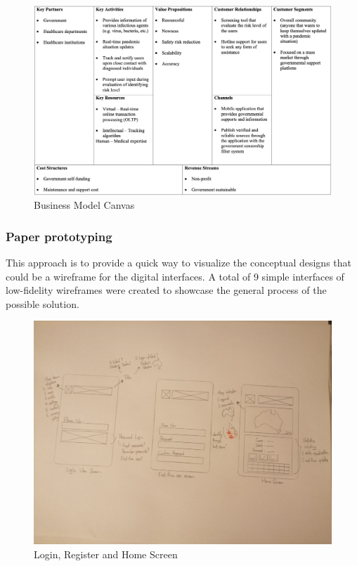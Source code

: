       \begin{figure}[H]
        \centering
        \includegraphics[width=18cm]{img/bmc.png}
        \caption{Business Model Canvas}
        \label{fig:bmc}
      \end{figure}
    
    \subsubsection{Paper prototyping}
      \par This approach is to provide a quick way to visualize the conceptual designs that could be a wireframe for the digital interfaces. A total of 9 simple interfaces of low-fidelity wireframes were created to showcase the general process of the possible solution.
      \begin{figure}[H]
        \centering
        \includegraphics[width=18cm]{img/low-fidelity-prototype/sketch-1.png}
        \caption{Login, Register and Home Screen}
        \label{fig:prototype-01}
      \end{figure}
      
